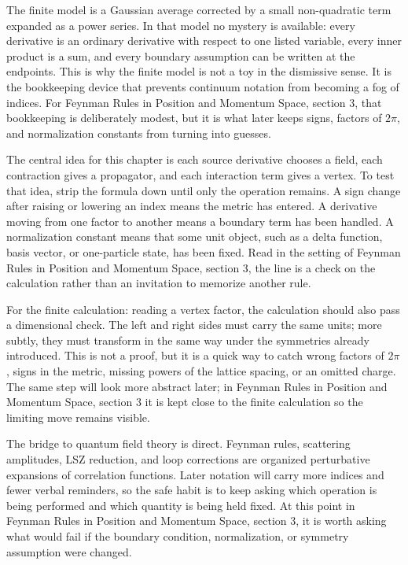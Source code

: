 The finite model is a Gaussian average corrected by a small non-quadratic term expanded as a power series.  In that model no mystery is available: every derivative is an ordinary derivative with respect to one listed variable, every inner product is a sum, and every boundary assumption can be written at the endpoints.  This is why the finite model is not a toy in the dismissive sense.  It is the bookkeeping device that prevents continuum notation from becoming a fog of indices.  For Feynman Rules in Position and Momentum Space, section 3, that bookkeeping is deliberately modest, but it is what later keeps signs, factors of \(2\pi\), and normalization constants from turning into guesses.

The central idea for this chapter is each source derivative chooses a field, each contraction gives a propagator, and each interaction term gives a vertex.  To test that idea, strip the formula down until only the operation remains.  A sign change after raising or lowering an index means the metric has entered.  A derivative moving from one factor to another means a boundary term has been handled.  A normalization constant means that some unit object, such as a delta function, basis vector, or one-particle state, has been fixed.  Read in the setting of Feynman Rules in Position and Momentum Space, section 3, the line is a check on the calculation rather than an invitation to memorize another rule.

For the finite calculation: reading a vertex factor, the calculation should also pass a dimensional check.  The left and right sides must carry the same units; more subtly, they must transform in the same way under the symmetries already introduced.  This is not a proof, but it is a quick way to catch wrong factors of \(2\pi\), signs in the metric, missing powers of the lattice spacing, or an omitted charge.  The same step will look more abstract later; in Feynman Rules in Position and Momentum Space, section 3 it is kept close to the finite calculation so the limiting move remains visible.

The bridge to quantum field theory is direct.  Feynman rules, scattering amplitudes, LSZ reduction, and loop corrections are organized perturbative expansions of correlation functions.  Later notation will carry more indices and fewer verbal reminders, so the safe habit is to keep asking which operation is being performed and which quantity is being held fixed.  At this point in Feynman Rules in Position and Momentum Space, section 3, it is worth asking what would fail if the boundary condition, normalization, or symmetry assumption were changed.

